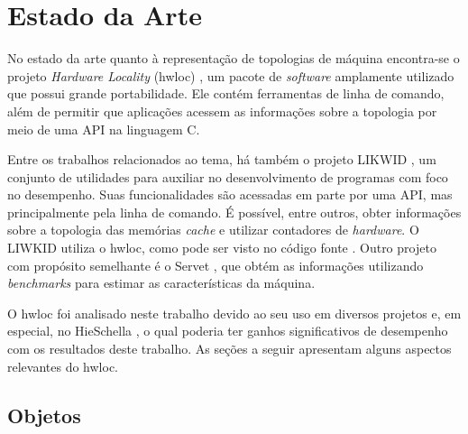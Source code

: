 \chapter{Estado da Arte} %
\label{cap:estado_da_arte}
\acresetall


No estado da arte quanto à representação de topologias de máquina encontra-se o projeto \textit{Hardware Locality} (hwloc) \cite{hwloc2010},
um pacote de \textit{software} amplamente utilizado que possui grande portabilidade.
Ele contém ferramentas de linha de comando, além de permitir que aplicações acessem as informações sobre a topologia por meio de uma API na linguagem C.

%
Entre os trabalhos relacionados ao tema,
há também o projeto LIKWID \cite{LIKWID},
um conjunto de utilidades para auxiliar no desenvolvimento de programas com foco no desempenho.
Suas funcionalidades são acessadas em parte por uma API, mas principalmente pela linha de comando.
É possível, entre outros, obter informações sobre a topologia das memórias \textit{cache} e utilizar contadores de \textit{hardware}.
O LIWKID utiliza o hwloc, como pode ser visto no código fonte \cite{LIKWIDCod}.
%
Outro projeto com propósito semelhante é o Servet \cite{servet}, que obtém as informações utilizando \textit{benchmarks} para estimar as características da máquina.

O hwloc foi analisado neste trabalho devido ao seu uso em diversos projetos e,
em especial, no HieSchella \cite{HieSchella}, o qual poderia ter ganhos significativos de desempenho com os resultados deste trabalho.
As seções a seguir apresentam alguns aspectos relevantes do hwloc.



\section{Objetos}
\label{sec:objetos}

